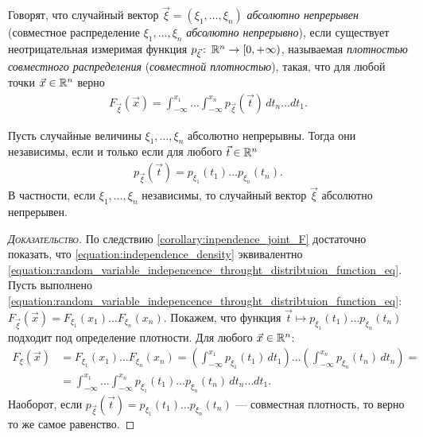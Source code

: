 \documentclass[../main.tex]{subfiles}
\begin{document}
\begin{df}
 Говорят, что случайный вектор $ \vec\xi = (\xi_1, \ldots, \xi_n) $ \textit{абсолютно непрерывен} (совместное распределение $ \xi_1,\ldots,\xi_n $ \textit{абсолютно непрерывно}), если существует неотрицательная измеримая функция $ p_{\vec\xi} \colon\, \mathbb{R}^{n}\to \left[0, +\infty\right)$, называемая \textit{плотностью совместного распределения} (\textit{совместной плотностью}), такая, что для любой точки $ \vec x \in \mathbb{R}^{n} $ верно
 \begin{align}
  \label{equation:density_of_joint_distribution}
  F_{\vec\xi}(\vec x) = \int_{-\infty}^{x_1}  \ldots \int_{-\infty}^{x_n} p_{\vec\xi}(\vec t) \, dt_n \ldots dt_1.
 \end{align} 
\end{df}
\begin{crly}
 Пусть случайные величины $\xi_1, \ldots, \xi_n $ абсолютно непрерывны. Тогда они независимы, если и только если для любого $ \vec t \in \mathbb{R}^{n} $
 \begin{align}
  \label{equation:independence_density}
  p_{\vec\xi}(\vec t) = p_{\xi_1}(t_1) \ldots p_{\xi_n}(t_n).
 \end{align} В частности, если $ \xi_1, \ldots, \xi_n $ независимы, то случайный вектор $ \vec\xi $ абсолютно непрерывен.
\end{crly}
\begin{proof}[\normalfont\textsc{Доказательство}]
 По следствию \ref{corollary:inpendence_joint_F} достаточно показать, что \eqref{equation:independence_density} эквивалентно \eqref{equation:random_variable_indepencence_throught_distribtuion_function_eq}. Пусть выполнено \eqref{equation:random_variable_indepencence_throught_distribtuion_function_eq}: $ F_{\vec\xi}(\vec x) = F_{\xi_1}(x_1) \ldots F_{\xi_n}(x_n) $. Покажем, что функция $ \vec t \mapsto p_{\xi_1}(t_1) \ldots p_{\xi_n}(t_n) $ подходит под определение плотности. Для любого $ \vec x \in \mathbb{R}^{n} $:
 \begin{align*}
  F_{\xi}(\vec x) &= F_{\xi_1}(x_1) \ldots F_{\xi_n}(x_n) = \left( \int_{-\infty}^{x_1} p_{\xi_1}(t_1)\,dt_1  \right) \ldots \left( \int_{-\infty}^{x_n} p_{\xi_n}(t_n)\,dt_n  \right) = \\
  &= \int_{-\infty}^{x_1} \ldots \int_{-\infty}^{x_n} p_{\xi_1}(t_1) \ldots p_{\xi_n}(t_n)\,dt_n \ldots dt_1.
 \end{align*} Наоборот, если $ p_{\vec\xi}(\vec t) = p_{\xi_1}(t_1) \ldots p_{\xi_n}(t_n) $ --- совместная плотность, то верно то же самое равенство.
\end{proof}
\end{document}
